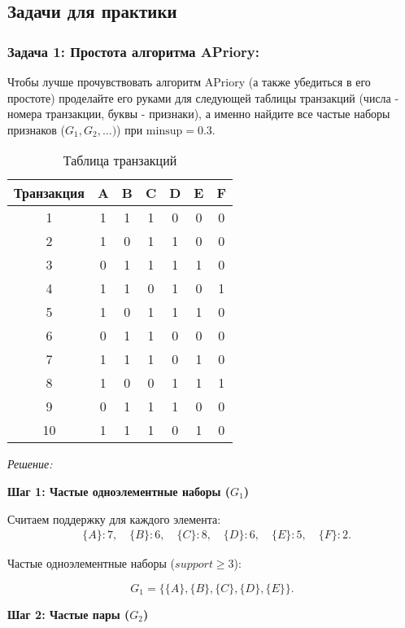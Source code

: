 \subsection{Задачи для практики}

\subsubsection{Задача 1: Простота алгоритма APriory:} Чтобы лучше прочувствовать алгоритм APriory (а также убедиться в его простоте) проделайте его руками для следующей таблицы транзакций (числа - номера транзакции, буквы - признаки), а именно найдите все частые наборы признаков (\(G_1, G_2, \ldots)\)) при \( \text{minsup}=0.3 \).
\begin{table}[ht!]
\centering
\caption{Таблица транзакций}
\begin{tabular}{ccccccc}
\toprule
\textbf{Транзакция} & \textbf{A} & \textbf{B} & \textbf{C} & \textbf{D} & \textbf{E} & \textbf{F} \\
\midrule
1  & 1 & 1 & 1 & 0 & 0 & 0 \\
2  & 1 & 0 & 1 & 1 & 0 & 0 \\
3  & 0 & 1 & 1 & 1 & 1 & 0 \\
4  & 1 & 1 & 0 & 1 & 0 & 1 \\
5  & 1 & 0 & 1 & 1 & 1 & 0 \\
6  & 0 & 1 & 1 & 0 & 0 & 0 \\
7  & 1 & 1 & 1 & 0 & 1 & 0 \\
8  & 1 & 0 & 0 & 1 & 1 & 1 \\
9  & 0 & 1 & 1 & 1 & 0 & 0 \\
10 & 1 & 1 & 1 & 0 & 1 & 0 \\
\bottomrule
\end{tabular}
\end{table}
\newline
\textit{Решение:}

\textbf{Шаг 1: Частые одноэлементные наборы (\( G_1 \))}

Считаем поддержку для каждого элемента:
\[
\begin{aligned}
&\{A\}: 7, \quad \{B\}: 6, \quad \{C\}: 8, \quad \{D\}: 6, \quad \{E\}: 5, \quad \{F\}: 2.
\end{aligned}
\]

Частые одноэлементные наборы (\( support \geq 3 \)):

\[
G_1 = \{\{A\}, \{B\}, \{C\}, \{D\}, \{E\}\}.
\]

\textbf{Шаг 2: Частые пары (\( G_2 \))}


